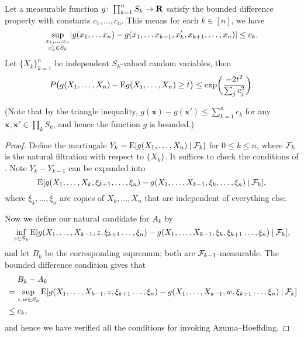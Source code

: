 \begin{namedthm}
\label{thm:bdd-diff} Let a measurable function $g\colon\prod_{k=1}^n S_k\to\mathbf{R}$ satisfy
the bounded difference property with constants $c_{1},\dotsc,c_{n}$. This means for each $k\in[n]$, we have 
\[
\sup_{\substack{x_{1},\dotsc, x_{n}\\x_{k}'\in S_k}}\lvert g(x_{1},\dotsc x_{n})-g(x_{1},\dotsc x_{k-1},x_{k}',x_{k+1},\dotsc,x_{n}) \rvert\leq c_{k}.
\]
Let $\{X_{k}\}_{k=1}^n$ be independent $S_k$-valued random variables, then 
\[
P\bigl(g(X_{1},\dotsc,X_{n})-\mathop{}\!\mathrm{E} g(X_{1},\dotsc,X_{n})\geq t\bigr)\leq\exp\biggl(\frac{-2t^{2}}{\sum_{j}c_{j}^{2}}\biggr).
\]

(Note that by the triangle inequality, $g(\mathbf x) - g(\mathbf x') \leq \sum_{k=1}^n c_k$ for any $\mathbf x ,\mathbf x' \in \prod_{k}S_k$, and hence the function $g$ is bounded.)
\end{namedthm}
\begin{proof}
    Define the martingale $Y_k = \mathop{}\!\mathrm{E} [g(X_1,\dotsc,X_n) \mathbin{|} \mathcal{F}_k]$ for $0\leq k \leq n$, where $\mathcal{F}_k$ is the natural filtration with respect to $\{X_k\}$. It suffices to check the conditions of . Note $Y_k - Y_{k-1}$  can be expanded into \begin{equation} \label{eq:expand-mg-bdd-diff}
        \E [g(X_1,\dotsc,X_{k},\xi_{k+1},\dotsc,\xi_{n}) - g(X_1,\dotsc,X_{k-1},\xi_{k},\dotsc,\xi_{n}) \giv \F_{k}], %
    \end{equation} where $\xi_k,\dotsc,\xi_n$ are copies of $X_{k},\dotsc,X_n$ that are independent of everything else.

    Now we define our natural candidate for $A_k$ by \[
        \inf_{z \in S_k} \mathop{}\!\mathrm{E} [g(X_1,\dotsc,X_{k-1},z,\xi_{k+1}\dotsc,\xi_{n}) - g(X_1,\dotsc,X_{k-1},\xi_{k},\xi_{k+1}\dotsc,\xi_{n}) \mathbin{|} \mathcal{F}_{k}],
    \] and let $B_k$ be the corresponding supremum; both are $\mathcal{F}_{k-1}$-measurable. The bounded difference condition gives that \begin{align*}
        & \phantom{{}={}}B_k - A_k\\ & = \sup_{z,w\in S_k} \E[g(X_1,\dotsc,X_{k-1},z,\xi_{k+1}\dotsc,\xi_{n}) - g(X_1,\dotsc,X_{k-1},w,\xi_{k+1}\dotsc,\xi_{n}) \giv \F_k]
        \\ & \leq c_k,
    \end{align*} and hence we have verified all the conditions for invoking Azuma--Hoeffding.
\end{proof}

